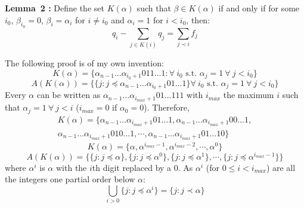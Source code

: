 \documentclass[twoside]{article}
\begin{document}
\vspace*{12pt}
\noindent
{\bf Lemma~2 \cite{bravyikitaev}:} Define the set $K(\alpha)$ such that $\beta \in K(\alpha)$ if and only if for some $i_0$, $\beta_{i_0} = 0$, $\beta_i = \alpha_i$ for $i\neq i_0$ and $\alpha_i = 1$ for $i< i_0$, then:
\begin{equation}
        q_i - \sum_{j \in K(i)} q_j = \sum_{j \prec i} f_j
\end{equation}
\vspace*{12pt}

\noindent
The following proof is of my own invention:
\begin{equation}
        K(\alpha) = \{ \alpha_{n-1} \ldots \alpha_{i_0 +1} 0 11 \ldots 1: \forall \>i_0\text{ s.t. } \alpha_{j} = 1 \> \forall \>j<i_0\}
\end{equation}
\begin{equation}
        \label{AK}
A(K(\alpha)) =  \{\{  j: j \preceq \alpha_{n-1} \ldots \alpha_{i_0+1}0 1 \ldots 1 \}\forall \>i_0\text{ s.t. } \alpha_{j} = 1 \> \forall \>j<i_0\}
\end{equation}
Every $\alpha$ can be written as $\alpha_{n-1}\ldots \alpha_{i_{max}+1}01\ldots 111$ with $i_{max}$ the maximum $i$ such that $\alpha_j =1 \> \forall \> j<i$ ($i_{max} = 0$ if $\alpha_0 = 0$). Therefore, 
\begin{multline}
        K(\alpha) = \{ \alpha_{n-1} \ldots \alpha_{i_{max}+1}0 1 \ldots 1 , \alpha_{n-1} \ldots \alpha_{i_{max}+1}0 0\ldots 1 ,\\ \alpha_{n-1} \ldots \alpha_{i_{max}+1}0 10 \ldots 1 , \cdots ,\alpha_{n-1} \ldots \alpha_{i_{max}+1}0 1 \ldots 10 \} \end{multline}
\begin{equation}
        K(\alpha) = \{ \alpha, \alpha^{i_{max}-1}, \alpha^{i_{max}-2}, \cdots, \alpha^0 \}
        \label{Kwrittenout}
\end{equation}
\begin{equation}
                A(K(\alpha)) = \{ \{ j: j \preceq \alpha \}, \{ j: j \preceq \alpha^0 \},\{ j: j \preceq \alpha^1 \}, \cdots, \{ j: j \preceq \alpha^{i_{max}-1} \} \}
        \end{equation}
        where $\alpha^i$ is $\alpha$ with the $i$th digit replaced by a $0$. As $\alpha^i$ (for $0\leq i< i_{max}$) are all the integers one partial order below $\alpha$:
        \begin{equation}\bigcup_{i>0} \{j: j \preceq \alpha^i\} = \{j: j \prec \alpha\}\end{equation}
\end{document}

